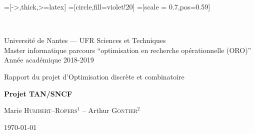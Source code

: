 \documentclass[a4paper,10pt]{article}
\begin{document}
\lstset{language=julia}

=[->,thick,>=latex]
=[circle,fill=violet!20]
=[scale = 0.7,pos=0.59]


~
\vspace{50mm}
{\large
\begin{center}
  Université de Nantes --- UFR Sciences et Techniques\\
  Master informatique parcours ``optimisation en recherche opérationnelle (ORO)''\\
  Année académique 2018-2019
  \vspace{30mm}
 
  { \LARGE
 
     Rapport du projet d'Optimisation discrète et combinatoire\\
     \vspace{5mm}
 
     {\huge \textbf{Projet TAN/SNCF}}
     \vspace{5mm}
 
     Marie \textsc{Humbert--Ropers}$^1$ --  Arthur \textsc{Gontier}$^2$
     \vspace{50mm}
  
     \today
  }  
\end{center}
}

\vfill
\break

\tableofcontents

\vfill
\break
\end{document}
